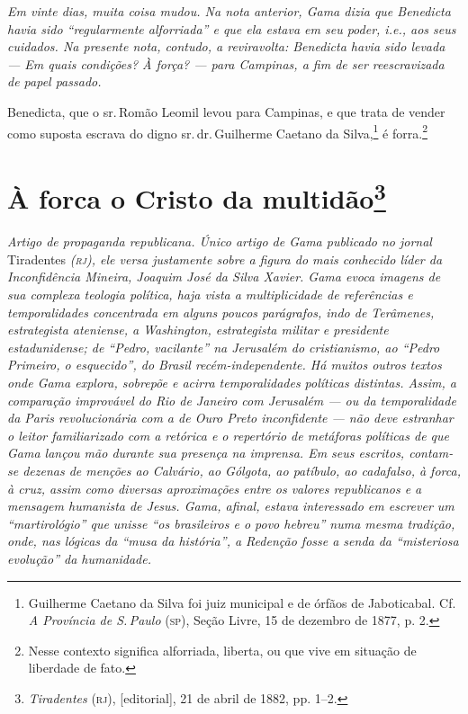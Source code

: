 \begin{resumo}
\emph{Em vinte dias, muita coisa mudou. Na nota anterior, Gama dizia que
Benedicta havia sido ``regularmente alforriada'' e que ela estava em seu
poder, i.e., aos seus cuidados. Na presente nota, contudo, a
reviravolta: Benedicta havia sido levada --- Em quais condições? À força?
--- para Campinas, a fim de ser reescravizada de papel passado.}
\end{resumo}

Benedicta, que o sr.\,Romão Leomil levou para Campinas, e que trata de
vender como suposta escrava do digno sr.\,dr.\,Guilherme Caetano da
Silva,\footnote{Guilherme Caetano da Silva foi juiz municipal e de
  órfãos de Jaboticabal. Cf. \emph{A Província de S.\,Paulo} (\textsc{sp}), Seção
  Livre, 15 de dezembro de 1877, p. 2.} é forra.\footnote{Nesse contexto significa
  alforriada, liberta, ou que vive em situação de liberdade de fato.}

\chapter{À forca o Cristo da multidão\footnote{
\emph{Tiradentes} (\textsc{rj}), {[}editorial{]}, 21 de abril de 1882, pp. 1--2.}}

\begin{resumo}
\emph{Artigo de propaganda republicana. Único artigo de Gama publicado
no jornal} Tiradentes \emph{(\textsc{rj}), ele versa justamente sobre a figura do
mais conhecido líder da Inconfidência Mineira, Joaquim José da Silva
Xavier. Gama evoca imagens de sua complexa teologia política, haja vista
a multiplicidade de referências e temporalidades concentrada em alguns
poucos parágrafos, indo de Terâmenes, estrategista ateniense, a
Washington, estrategista militar e presidente estadunidense; de ``Pedro,
vacilante'' na Jerusalém do cristianismo, ao ``Pedro Primeiro, o
esquecido'', do Brasil recém-independente. Há muitos outros textos onde
Gama explora, sobrepõe e acirra temporalidades políticas distintas.
Assim, a comparação improvável do Rio de Janeiro com Jerusalém --- ou da
temporalidade da Paris revolucionária com a de Ouro Preto inconfidente
--- não deve estranhar o leitor familiarizado com a retórica e o
repertório de metáforas políticas de que Gama lançou mão durante sua
presença na imprensa. Em seus escritos, contam-se dezenas de menções ao
Calvário, ao Gólgota, ao patíbulo, ao cadafalso, à forca, à cruz, assim
como diversas aproximações entre os valores republicanos e a mensagem
humanista de Jesus. Gama, afinal, estava interessado em escrever um
``martirológio'' que unisse ``os brasileiros e o povo hebreu'' numa mesma
tradição, onde, nas lógicas da ``musa da história'', a Redenção fosse a
senda da ``misteriosa evolução'' da humanidade. }
\end{resumo}

